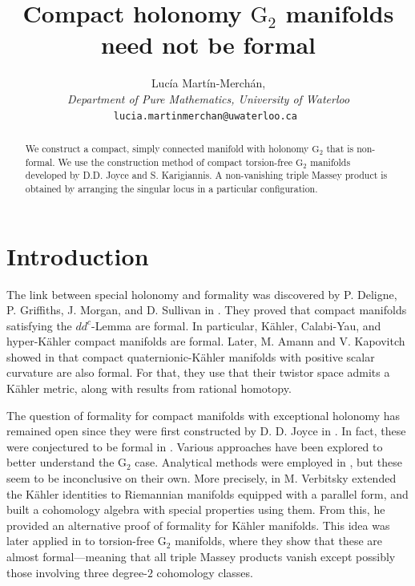 \documentclass[10pt]{article}
\newcommand{\Gtwo}{\mathrm{G}_2}
\theoremstyle{plain}
\theoremstyle{definition}
\theoremstyle{remark}
\begin{document}
\title{Compact holonomy $\Gtwo$ manifolds need not be formal}

\author{ Luc\'ia Mart\'in-Merch\'an, \\
\emph{Department of Pure Mathematics, University of Waterloo} \\ \tt{lucia.martinmerchan@uwaterloo.ca} }

\maketitle

\begin{abstract}
\noindent We construct a compact, simply connected manifold with holonomy $\Gtwo$ that is non-formal. We use the construction method of compact torsion-free $\Gtwo$ manifolds developed by D.D. Joyce and S. Karigiannis. A non-vanishing triple Massey product is obtained by arranging the singular locus in a  particular configuration.
\end{abstract}

\tableofcontents

\section{Introduction} \label{sec:introduction}

The link between special holonomy and formality was discovered by P. Deligne, P. Griffiths, J. Morgan, and D. Sullivan in \cite{DGMS}. They proved that compact manifolds satisfying the $dd^c$-Lemma are formal. In particular, Kähler, Calabi-Yau, and hyper-Kähler compact manifolds are formal. Later, M. Amann and V. Kapovitch showed in \cite{AK} that compact quaternionic-Kähler manifolds with positive scalar curvature are also formal. For that, they use that their twistor space admits a Kähler metric, along with results from rational homotopy.


The question of formality for compact manifolds with exceptional holonomy
has remained open
since they were first constructed by D. D. Joyce in \cites{J1,J2,J3,J4}. In fact, these were conjectured to be formal in \cite[Conjecture 2]{AK}.
Various approaches have been explored to better understand the $\Gtwo$ case. Analytical methods were employed in \cites{CKT, Verbitsky}, but these seem to be inconclusive on their own. More precisely, in \cite{Verbitsky} M. Verbitsky extended the Kähler identities to Riemannian manifolds equipped with a parallel form, and built a cohomology algebra with special properties using them. From this, he provided an alternative proof of formality for Kähler manifolds. This idea was later applied in \cite{CKT} to torsion-free $\Gtwo$ manifolds, where they show that these are almost formal—meaning that all triple Massey products vanish except possibly those involving three degree-$2$ cohomology classes.
\end{document}
